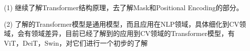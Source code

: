 \documentclass[letterpaper,10pt]{article}
\begin{document}
	(1) 继续了解Transformer结构原理，去了解Mask和Positional Encoding的部分。
	
	(2) 了解的Transformer模型是通用模型，而且应用在NLP领域，具体细化到CV领域，会有领域差异，目前已经了解到的应用到CV领域的Transformer模型，有ViT，DeiT，Swin，对它们进行一个初步的了解
	
	
	
\end{document}
